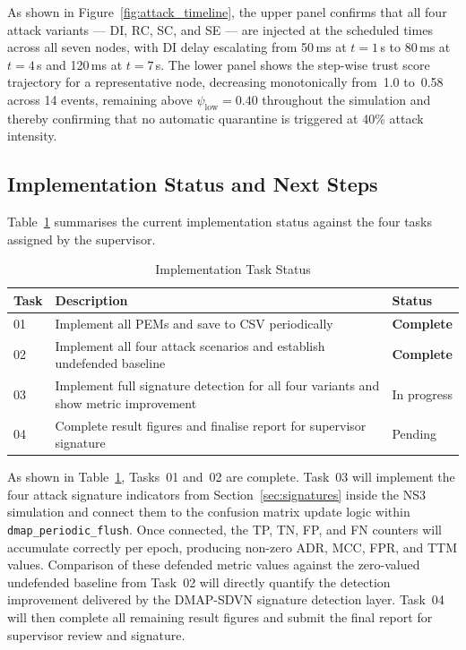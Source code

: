 As shown in Figure~\ref{fig:attack_timeline}, the
upper panel confirms that all four attack variants
--- DI, RC, SC, and SE --- are injected at the
scheduled times across all seven nodes, with DI
delay escalating from 50\,ms at $t{=}1$\,s to
80\,ms at $t{=}4$\,s and 120\,ms at $t{=}7$\,s.
The lower panel shows the step-wise trust score
trajectory for a representative node, decreasing
monotonically from~1.0 to~0.58 across 14 events,
remaining above $\psi_{\mathrm{low}} = 0.40$
throughout the simulation and thereby confirming
that no automatic quarantine is triggered at
40\% attack intensity.

\subsection{Implementation Status and Next Steps}

Table~\ref{tab:task_status} summarises the current
implementation status against the four tasks assigned
by the supervisor.

\begin{table}[htb]
\centering
\caption{Implementation Task Status}
\label{tab:task_status}
\begin{tabularx}{\linewidth}{l X l} %
\hline
\textbf{Task} & \textbf{Description} & \textbf{Status} \\
\hline
01 & Implement all PEMs and save to CSV periodically & \textbf{Complete} \\
02 & Implement all four attack scenarios and establish undefended baseline & \textbf{Complete} \\
03 & Implement full signature detection for all four variants and show metric improvement & In progress \\
04 & Complete result figures and finalise report for supervisor signature & Pending \\
\hline
\end{tabularx}
\end{table}

As shown in Table~\ref{tab:task_status}, Tasks~01
and~02 are complete. Task~03 will implement the four
attack signature indicators from
Section~\ref{sec:signatures} inside the NS3
simulation and connect them to the confusion matrix
update logic within \texttt{dmap\_periodic\_flush}.
Once connected, the TP, TN, FP, and FN counters will
accumulate correctly per epoch, producing non-zero
ADR, MCC, FPR, and TTM values. Comparison of these
defended metric values against the zero-valued
undefended baseline from Task~02 will directly
quantify the detection improvement delivered by the
DMAP-SDVN signature detection layer. Task~04 will
then complete all remaining result figures and
submit the final report for supervisor review and
signature.